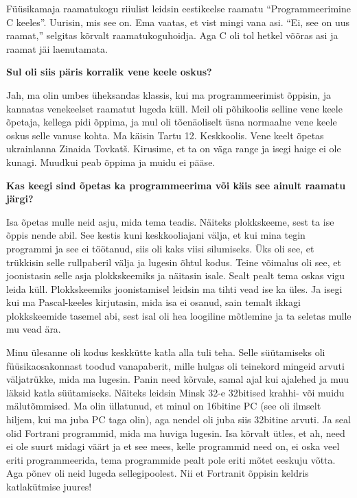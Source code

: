 Füüsikamaja raamatukogu riiulist leidsin eestikeelse raamatu
\enquote{Programmeerimine C keeles}. Uurisin, mis see on. Ema vaatas, et vist mingi vana asi.
\enquote{Ei, see on uus raamat,} selgitas kõrvalt raamatukoguhoidja. Aga C oli tol hetkel
võõras asi ja raamat jäi laenutamata.

\textbf{Sul oli siis päris korralik vene keele oskus?}

Jah, ma olin umbes üheksandas klassis, kui ma programmeerimist õppisin, ja
kannatas venekeelset raamatut lugeda küll. Meil oli põhikoolis selline vene
keele õpetaja, kellega pidi õppima, ja mul oli tõenäoliselt üsna normaalne vene
keele oskus selle vanuse kohta. Ma käisin Tartu 12.
Keskkoolis. Vene keelt õpetas ukrainlanna Zinaida
Tovkatš. Kirusime, et ta on väga range ja
isegi haige ei ole kunagi. Muudkui peab õppima ja muidu ei pääse.

\textbf{Kas keegi sind õpetas ka programmeerima või käis see ainult raamatu järgi?}

Isa õpetas mulle neid asju, mida tema teadis. Näiteks 
plokkskeeme, sest ta ise õppis nende abil. See kestis kuni keskkooliajani
välja, et kui mina tegin programmi ja see ei töötanud, siis oli kaks viisi
silumiseks. Üks oli see, et trükkisin selle rullpaberil välja ja lugesin õhtul kodus.
Teine võimalus oli see, et joonistasin selle asja plokkskeemiks ja näitasin
isale. Sealt pealt tema oskas vigu leida küll. Plokkskeemiks joonistamisel
leidsin ma tihti vead ise ka üles. Ja isegi kui ma Pascal-keeles kirjutasin,
mida isa ei osanud, sain temalt ikkagi plokkskeemide tasemel abi, sest isal
oli hea loogiline mõtlemine ja ta seletas mulle mu vead ära.

Minu ülesanne oli kodus keskkütte katla alla tuli teha. Selle süütamiseks oli
füüsikaosakonnast toodud vanapaberit, mille hulgas oli teinekord mingeid arvuti
väljatrükke, mida ma lugesin. Panin need kõrvale, samal ajal kui ajalehed ja
muu läksid katla süütamiseks. Näiteks leidsin Minsk
32-e 32bitised krahhi- või
muidu mälutõmmised. Ma olin üllatunud, et minul on 16bitine PC (see oli ilmselt
hiljem, kui ma juba PC taga olin), aga nendel oli juba siis 32bitine
arvuti. Ja seal olid Fortrani programmid, mida ma huviga lugesin. Isa kõrvalt
ütles, et ah, need ei ole suurt midagi väärt ja et see mees, kelle programmid
need on, ei oska veel eriti programmeerida, tema programmide pealt pole eriti
mõtet eeskuju võtta. Aga põnev oli neid lugeda sellegipoolest. Nii et Fortranit
õppisin keldris katlakütmise juures!

